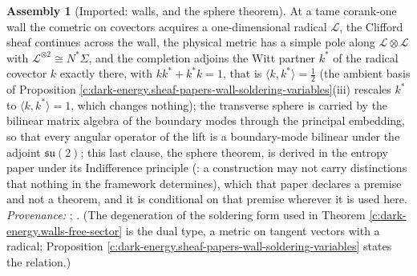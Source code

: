 \documentclass[11pt]{article}
\theoremstyle{definition}
\newtheorem{assembled}[theorem]{Assembly}
\theoremstyle{plain}
\newcommand{\changedmark}[2]{\marginpar{\raggedright\scriptsize\color{#1}#2}}
\providecommand{\ip}{}\renewcommand{\ip}[2]{\langle #1, #2\rangle}
\begin{document}
\begin{assembled}[Imported: walls, and the sphere theorem]\label{c:dark-energy.imported-walls-sphere-theorem}
\changedmark{gray}{reworded}
At a tame corank-one wall the cometric on covectors acquires a one-dimensional radical $\mathcal{L}$, the Clifford sheaf continues across the wall, the physical metric has a simple pole along $\mathcal{L}\otimes\mathcal{L}$ with $\mathcal{L}^{\otimes 2} \cong N^*\Sigma$, and the completion adjoins the Witt partner $k^*$ of the radical covector $k$ exactly there, with $kk^* + k^*k = 1$, that is $\ip{k}{k^*} = \tfrac12$ (the ambient basis of Proposition \ref{c:dark-energy.sheaf-papers-wall-soldering-variables}(iii) rescales $k^*$ to $\ip{k}{k^*} = 1$, which changes nothing); the transverse sphere is carried by the bilinear matrix algebra of the boundary modes through the principal embedding, so that every angular operator of the lift is a boundary-mode bilinear under the adjoint $\mathfrak{su}(2)$; this last clause, the sphere theorem, is derived in the entropy paper under its Indifference principle (\cite[Principle~5.4]{ButlerT8}: a construction may not carry distinctions that nothing in the framework determines), which that paper declares a premise and not a theorem, and it is conditional on that premise wherever it is used here. \emph{Provenance:} \cite[Thm.~3.1, Cor.~4.5, Thm.~6.2]{ButlerT4}; \cite[Prop.~5.2, Principle~5.4, Thm.~5.5, Prop.~5.6]{ButlerT8}. (The degeneration of the soldering form used in Theorem \ref{c:dark-energy.walls-free-sector} is the dual type, a metric on tangent vectors with a radical; Proposition \ref{c:dark-energy.sheaf-papers-wall-soldering-variables} states the relation.)
\end{assembled}
\end{document}
